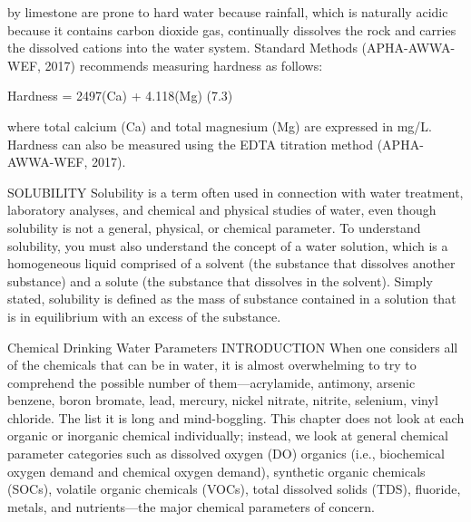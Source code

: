 \documentclass{article}
\begin{document}
by limestone are prone to hard water because rainfall, which is
naturally acidic because it contains carbon dioxide gas, continually
dissolves the rock and carries the dissolved cations into the water
system. Standard Methods (APHA-AWWA-WEF, 2017) recommends measuring
hardness as follows:

Hardness = 2497(Ca) + 4.118(Mg) (7.3)

where total calcium (Ca) and total magnesium (Mg) are expressed in mg/L.
Hardness can also be measured using the EDTA titration method
(APHA-AWWA-WEF, 2017).

SOLUBILITY Solubility is a term often used in connection with water
treatment, laboratory analyses, and chemical and physical studies of
water, even though solubility is not a general, physical, or chemical
parameter. To understand solubility, you must also understand the
concept of a water solution, which is a homogeneous liquid comprised of
a solvent (the substance that dissolves another substance) and a solute
(the substance that dissolves in the solvent). Simply stated, solubility
is defined as the mass of substance contained in a solution that is in
equilibrium with an excess of the substance.

Chemical Drinking Water Parameters INTRODUCTION When one considers all
of the chemicals that can be in water, it is almost overwhelming to try
to comprehend the possible number of them---acrylamide, antimony,
arsenic benzene, boron bromate, lead, mercury, nickel nitrate, nitrite,
selenium, vinyl chloride. The list it is long and mind-boggling. This
chapter does not look at each organic or inorganic chemical
individually; instead, we look at general chemical parameter categories
such as dissolved oxygen (DO) organics (i.e., biochemical oxygen demand
and chemical oxygen demand), synthetic organic chemicals (SOCs),
volatile organic chemicals (VOCs), total dissolved solids (TDS),
fluoride, metals, and nutrients---the major chemical parameters of
concern.
\end{document}
